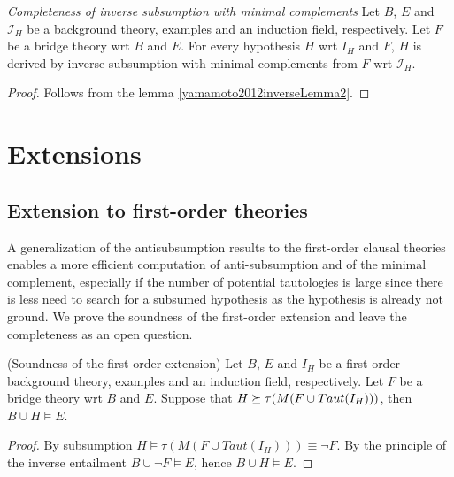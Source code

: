 \begin{thm}\emph{Completeness of inverse subsumption with minimal complements} Let $B$, $E$ and $\mathcal{I}_H$ be a background theory, examples and an induction field,
respectively. Let $F$ be a bridge theory wrt $B$ and $E$. For every hypothesis $H$ wrt $I_H$ and $F$,
$H$ is derived by inverse subsumption with minimal complements from $F$ wrt $\mathcal{I}_H$.
\end{thm}
\begin{proof}
Follows from the lemma \ref{yamamoto2012inverseLemma2}.
\end{proof}
\section{Extensions}\label{inverse_subsumption_extensions}
\subsection{Extension to first-order theories}
A generalization of the antisubsumption results to the first-order clausal theories enables a more efficient computation of anti-subsumption and of the minimal complement, especially if the number of potential tautologies is large since there is less need to search for a subsumed hypothesis as the hypothesis is already not ground. We prove the soundness of the first-order extension and leave the completeness as an open question.

\begin{proposition}\label{soundness_first_order_extension}(Soundness of the first-order extension)
Let $B$, $E$ and $I_H$ be a first-order background theory, examples and an induction field, respectively. Let $F$ be a bridge theory wrt $B$ and $E$. Suppose that $H \succeq \tau(M(F \cup Taut(I_H)))$, then $B \cup H \models E$.
\end{proposition}
\begin{proof}
By subsumption $H \models \tau(M(F \cup Taut(I_H))) \equiv \neg F$. By the principle of the inverse entailment $B \cup \neg F \models E$, hence
$B \cup H \models E$.
\end{proof}

